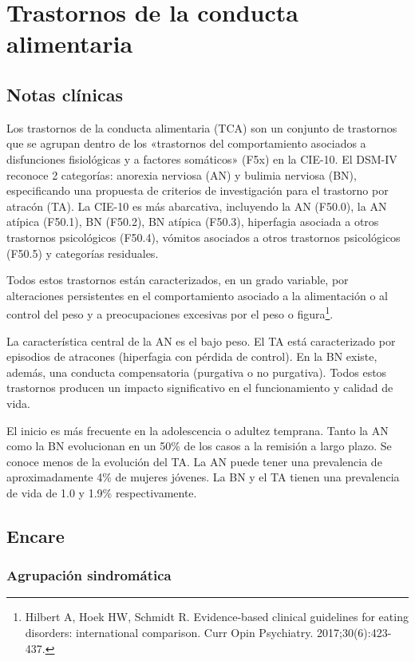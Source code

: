 \chapter{Trastornos de la conducta alimentaria}
\section*{Notas clínicas}
Los trastornos de la conducta alimentaria (TCA) son un conjunto de trastornos que se agrupan dentro de los «trastornos del comportamiento asociados a disfunciones fisiológicas y a factores somáticos» (F5x) en la CIE-10. El DSM-IV reconoce 2 categorías: anorexia nerviosa (AN) y bulimia nerviosa (BN), especificando una propuesta de criterios de investigación para el trastorno por atracón (TA). La CIE-10 es más abarcativa, incluyendo la AN (F50.0), la AN atípica (F50.1), BN (F50.2), BN atípica (F50.3), hiperfagia asociada a otros trastornos psicológicos (F50.4), vómitos asociados a otros trastornos psicológicos (F50.5) y categorías residuales.

Todos estos trastornos están caracterizados, en un grado variable, por alteraciones persistentes en el comportamiento asociado a la alimentación o al control del peso y a preocupaciones excesivas por el peso o figura\footnote{Hilbert A, Hoek HW, Schmidt R. Evidence-based clinical guidelines for eating disorders: international comparison. Curr Opin Psychiatry. 2017;30(6):423-437.}.

La característica central de la AN es el bajo peso. El TA está caracterizado por episodios de atracones (hiperfagia con pérdida de control). En la BN existe, además, una conducta compensatoria (purgativa o no purgativa). Todos estos trastornos producen un impacto significativo en el funcionamiento y calidad de vida.

El inicio es más frecuente en la adolescencia o adultez temprana. Tanto la AN como la BN evolucionan en un 50\% de los casos a la remisión a largo plazo. Se conoce menos de la evolución del TA. La AN puede tener una prevalencia de aproximadamente 4\% de mujeres jóvenes. La BN y el TA tienen una prevalencia de vida de 1.0 y 1.9\% respectivamente.

\section*{Encare}
\subsection*{Agrupación sindromática}

